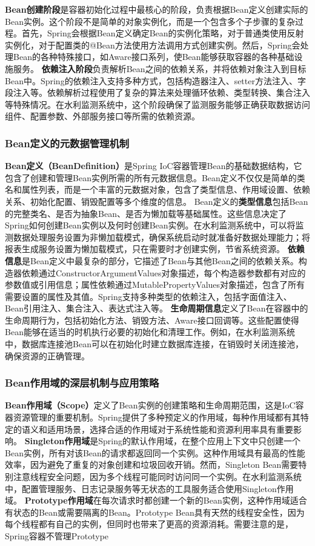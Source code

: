 \textbf{Bean创建阶段}是容器初始化过程中最核心的阶段，负责根据Bean定义创建实际的Bean实例。这个阶段不是简单的对象实例化，而是一个包含多个子步骤的复杂过程。首先，Spring会根据Bean定义确定Bean的实例化策略，对于普通类使用反射实例化，对于配置类的@Bean方法使用方法调用方式创建实例。然后，Spring会处理Bean的各种特殊接口，如Aware接口系列，使Bean能够获取容器的各种基础设施服务。 \textbf{依赖注入阶段}负责解析Bean之间的依赖关系，并将依赖对象注入到目标Bean中。Spring的依赖注入支持多种方式，包括构造器注入、setter方法注入、字段注入等。依赖解析过程使用了复杂的算法来处理循环依赖、类型转换、集合注入等特殊情况。在水利监测系统中，这个阶段确保了监测服务能够正确获取数据访问组件、配置参数、外部服务接口等所需的依赖资源。 \subsubsection{Bean定义的元数据管理机制}\label{beanux5b9aux4e49ux7684ux5143ux6570ux636eux7ba1ux7406ux673aux5236} \textbf{Bean定义（BeanDefinition）}是Spring IoC容器管理Bean的基础数据结构，它包含了创建和管理Bean实例所需的所有元数据信息。Bean定义不仅仅是简单的类名和属性列表，而是一个丰富的元数据对象，包含了类型信息、作用域设置、依赖关系、初始化配置、销毁配置等多个维度的信息。 Bean定义的\textbf{类型信息}包括Bean的完整类名、是否为抽象Bean、是否为懒加载等基础属性。这些信息决定了Spring如何创建Bean实例以及何时创建Bean实例。在水利监测系统中，可以将监测数据处理服务设置为非懒加载模式，确保系统启动时就准备好数据处理能力；将报表生成服务设置为懒加载模式，只在需要时才创建实例，节省系统资源。 \textbf{依赖信息}是Bean定义中最复杂的部分，它描述了Bean与其他Bean之间的依赖关系。构造器依赖通过ConstructorArgumentValues对象描述，每个构造器参数都有对应的参数值或引用信息；属性依赖通过MutablePropertyValues对象描述，包含了所有需要设置的属性及其值。Spring支持多种类型的依赖注入，包括字面值注入、Bean引用注入、集合注入、表达式注入等。 \textbf{生命周期信息}定义了Bean在容器中的生命周期行为，包括初始化方法、销毁方法、Aware接口回调等。这些配置使得Bean能够在适当的时机执行必要的初始化和清理工作。例如，在水利监测系统中，数据库连接池Bean可以在初始化时建立数据库连接，在销毁时关闭连接池，确保资源的正确管理。 \subsubsection{Bean作用域的深层机制与应用策略}\label{beanux4f5cux7528ux57dfux7684ux6df1ux5c42ux673aux5236ux4e0eux5e94ux7528ux7b56ux7565} \textbf{Bean作用域（Scope）}定义了Bean实例的创建策略和生命周期范围，这是IoC容器资源管理的重要机制。Spring提供了多种预定义的作用域，每种作用域都有其特定的语义和适用场景，选择合适的作用域对于系统性能和资源利用率具有重要影响。 \textbf{Singleton作用域}是Spring的默认作用域，在整个应用上下文中只创建一个Bean实例，所有对该Bean的请求都返回同一个实例。这种作用域具有最高的性能效率，因为避免了重复的对象创建和垃圾回收开销。然而，Singleton Bean需要特别注意线程安全问题，因为多个线程可能同时访问同一个实例。在水利监测系统中，配置管理服务、日志记录服务等无状态的工具服务适合使用Singleton作用域。 \textbf{Prototype作用域}在每次请求时都创建一个新的Bean实例，这种作用域适合有状态的Bean或需要隔离的Bean。Prototype Bean具有天然的线程安全性，因为每个线程都有自己的实例，但同时也带来了更高的资源消耗。需要注意的是，Spring容器不管理Prototype 